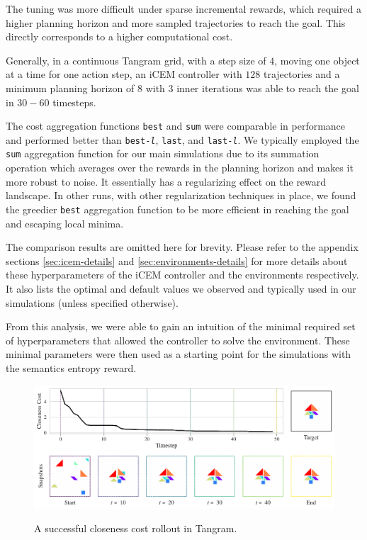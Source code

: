 The tuning was more difficult under sparse incremental rewards, which required a higher planning horizon and more sampled trajectories to reach the goal.
This directly corresponds to a higher computational cost.

Generally, in a continuous Tangram grid, with a step size of \(4\), moving one object at a time for one action step, an iCEM controller with \(128\) trajectories and a minimum planning horizon of \(8\) with \(3\) inner iterations was able to reach the goal in \(30-60\) timesteps.

The cost aggregation functions \texttt{best} and \texttt{sum} were comparable in performance and performed better than \texttt{best-\emph{l}}, \texttt{last}, and \texttt{last-\emph{l}}.
We typically employed the \texttt{sum} aggregation function for our main simulations due to its summation operation which averages over the rewards in the planning horizon and makes it more robust to noise.
It essentially has a regularizing effect on the reward landscape.
In other runs, with other regularization techniques in place, we found the greedier \texttt{best} aggregation function to be more efficient in reaching the goal and escaping local minima.

The comparison results are omitted here for brevity. Please refer to the appendix sections \ref{sec:icem-details} and \ref{sec:environments-details} for more details about these hyperparameters of the iCEM controller and the environments respectively. It also lists the optimal and default values we observed and typically used in our simulations (unless specified otherwise).

From this analysis, we were able to gain an intuition of the minimal required set of hyperparameters that allowed the controller to solve the environment.
These minimal parameters were then used as a starting point for the simulations with the semantics entropy reward.

\begin{figure}[H]
    \centering
    \href{https://drive.google.com/file/d/15IAo_xsNFSUI0YFVjrIBfn7LAV2hO68E}{\includegraphics[width=\textwidth]{images/closeness_trajectory_495.pdf}}
    \caption[A successful closeness cost rollout in Tangram.]{A successful closeness cost rollout in Tangram\footnotemark[1].}
    \label{fig:closeness-rollouts}
\end{figure}

